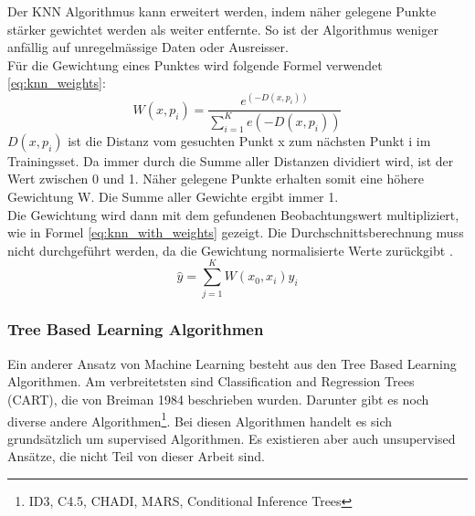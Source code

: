 %
Der KNN Algorithmus kann erweitert werden, indem näher gelegene Punkte stärker gewichtet werden als weiter entfernte. So ist der Algorithmus weniger anfällig auf unregelmässige Daten oder Ausreisser.\\
Für die Gewichtung eines Punktes wird folgende Formel verwendet \eqref{eq:knn_weights}:
\begin{equation}
\label{eq:knn_weights}
W(x, p_i) = \frac{e^{(-D(x, p_i))}}{\sum_{i=1}^{K} e(-D(x, p_i))}
\end{equation}
%
$D(x, p_i)$ ist die Distanz vom gesuchten Punkt x zum nächsten Punkt i im Trainingsset. Da immer durch die Summe aller Distanzen dividiert wird, ist der Wert zwischen 0 und 1. Näher gelegene Punkte erhalten somit eine höhere Gewichtung W. Die Summe aller Gewichte ergibt immer 1.\\
Die Gewichtung wird dann mit dem gefundenen Beobachtungswert multipliziert, wie in Formel \eqref{eq:knn_with_weights} gezeigt. Die Durchschnittsberechnung muss nicht durchgeführt werden, da die Gewichtung normalisierte Werte zurückgibt \cite{knn_2, knn_3}.
\begin{equation}
\label{eq:knn_with_weights}
\hat{y} = \sum_{j=1}^{K} W(x_0, x_i) y_i
\end{equation}
%
%
\subsubsection{Tree Based Learning Algorithmen}
Ein anderer Ansatz von Machine Learning besteht aus den Tree Based Learning Algorithmen. Am verbreitetsten sind Classification and Regression Trees (CART), die von Breiman 1984 beschrieben wurden. Darunter gibt es noch diverse andere Algorithmen\footnote{ID3, C4.5, CHADI, MARS, Conditional Inference Trees}. Bei diesen Algorithmen handelt es sich grundsätzlich um supervised Algorithmen. Es existieren aber auch unsupervised Ansätze, die nicht Teil von dieser Arbeit sind.\\[2ex]


